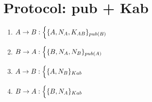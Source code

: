 \section{Protocol: pub + Kab}

\begin{enumerate}
    \item $ A \rightarrow B : \Bigl\{ \{A, N_A, K_{AB}\}_{pub(B)}$
    \item $ B \rightarrow A : \Bigl\{ \{B, N_A, N_B\}_{pub(A)}$
    \item $ A \rightarrow B : \Bigl\{ \{A, N_B\}_{Kab}$
    \item $ B \rightarrow A : \Bigl\{ \{B, N_A\}_{Kab}$

\end{enumerate}
